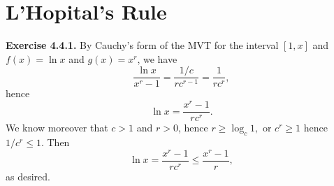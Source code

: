 \documentclass[12pt]{book}
\newenvironment{exercise}[2][Exercise]{\begin{trivlist}
\item[\hskip \labelsep {\bfseries #1}\hskip \labelsep {\bfseries #2.}]}{\end{trivlist}}
\newcommand{\prb}[1]{\textbf{Exercise #1.}}
\begin{document}
\begin{exercise}{4.3.9}
\end{exercise}


\begin{exercise}{4.3.10}
\end{exercise}


\begin{exercise}{4.3.11}
\end{exercise}

\begin{exercise}{4.3.12}
\end{exercise}


\begin{exercise}{4.3.13}
\end{exercise}


\begin{exercise}{4.3.14}
\end{exercise}

\begin{exercise}{4.3.15}
\end{exercise}

\begin{exercise}{4.3.16}
\end{exercise}

\section{L'Hopital's Rule}


\prb{4.4.1} By Cauchy's form of the MVT for the interval $[1, x]$ and $f(x) = \ln x$ and $g(x) = x^r$, we have $$\dfrac{\ln x}{x^r - 1} = \dfrac{1/c}{rc^{r-1}} = \dfrac{1}{rc^r},$$ hence $$\ln x = \dfrac{x^r - 1}{rc^r}.$$ We know moreover that $c > 1$ and $r > 0$, hence $r \geq \log_c 1,$ or $c^r \geq 1$ hence $1/c^r \leq 1.$ Then $$\ln x = \dfrac{x^r - 1}{rc^r} \leq \dfrac{x^r-1}{r},$$ as desired.


\begin{exercise}{4.4.2}
\end{exercise}



\begin{exercise}{4.4.3}
\end{exercise}



\begin{exercise}{4.4.4}
\end{exercise}
\end{document}
